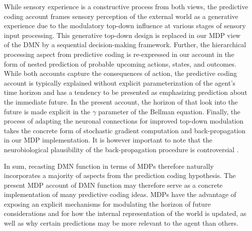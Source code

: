 \documentclass[10pt,letterpaper]{article}
\newcommand{\suggestremove}[1]{{\color{red} \sout{#1}}}
\begin{document}
While sensory experience is a constructive process from both views,
the predictive coding account frames
sensory perception of the external world
as a generative experience due to the modulatory top-down influence at
various stages of sensory input processing.
This generative top-down design is replaced in our MDP view of the DMN
by a sequential decision-making framework.
Further,
the hierarchical processing aspect from predictive coding
is re-expressed in our account in the form of
nested prediction of probable upcoming actions, states, and outcomes.
While both accounts capture the consequences of action,
the predictive coding account is typically explained without
explicit parameterization of the agent's time horizon and
has a tendency to be presented as emphasizing prediction about the
immediate future.
In the present account, the horizon of that
look into the future is made explicit in the $\gamma$ parameter
of the Bellman equation.
Finally,
the process of adapting the neuronal connections
for improved top-down modulation
takes the concrete form of stochastic gradient computation and
back-propagation in our MDP implementation.
It is however important to note that
the neurobiological plausibility of
the back-propagation procedure is controversial
\citep{goodfellow2016deep}.


In sum,
recasting DMN function in terms of MDPs therefore naturally incorporates
a majority of aspects from the prediction coding hypothesis.
The present MDP account of DMN function may therefore
serve as a concrete implementation of
many predictive coding ideas.
MDPs have the advantage of exposing an explicit
mechanisms for modulating the horizon of future considerations and for
how the internal representation of the world is updated,
as well as why certain predictions may be more relevant to the agent than others.
\end{document}
